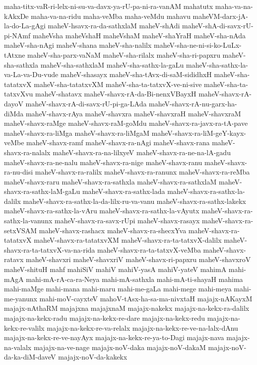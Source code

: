 {maha-titx-vaR-ri-lelx-ni-su-va-davx-ya-rU-pa-ni-ra-vanAM
mahatutx
maha-va-na-kAkxDe
maha-va-na-ridu
maha-veMba
maha-veMdu
mahavu
maheVM-darx-jA-la-do-La-gAgi
maheV-hsavx-ra-da-sathxlaM
maheV-shAdi
maheV-shA-di-savx-rU-pi-NAmf
maheVsha
maheVshaH
maheVshaM
maheV-shaYraH
maheV-sha-nAda
maheV-sha-nAgi
maheV-shana
maheV-sha-nalilx
maheV-sha-ne-ni-si-ko-LuLx-tAtxne
maheV-sha-parx-vaNaM
maheV-sha-rilalx
maheV-sha-ri-papxru
maheV-sha-sathxla
maheV-sha-sathxlaM
maheV-sha-sathx-la-gaLu
maheV-sha-sathx-la-va-La-va-Du-vude
maheV-shasayx
maheV-sha-tAvx-di-saM-sididhxH
maheV-sha-tatatxvX
maheV-sha-tatatxvXM
maheV-sha-ta-tatxvX-ve-ni-sive
maheV-sha-ta-tatxvXvu
maheV-shatavx
maheV-shavx-rA-da-Bi-nenxVBayxH
maheV-shavx-rA-dayoV
maheV-shavx-rA-di-savx-rU-pi-ga-LAda
maheV-shavx-rA-nu-garx-ha-diMda
maheV-shavx-rAya
maheV-shavxra
maheV-shavxraH
maheV-shavxraM
maheV-shavx-raMge
maheV-shavx-raM-goMdu
maheV-shavx-ra-javx-ra-tA-pave
maheV-shavx-ra-liMga
maheV-shavx-ra-liMgaM
maheV-shavx-ra-liM-geY-kayx-veMbe
maheV-shavx-ramf
maheV-shavx-ra-nAgi
maheV-shavx-rana
maheV-shavx-ra-nalalx
maheV-shavx-ra-na-lilxyeV
maheV-shavx-ra-ne-na-lA-gadu
maheV-shavx-ra-ne-nalu
maheV-shavx-ra-nige
maheV-shavx-ranu
maheV-shavx-ra-nu-disi
maheV-shavx-ra-ralilx
maheV-shavx-ra-ranunx
maheV-shavx-ra-reMba
maheV-shavx-raru
maheV-shavx-ra-sathxla
maheV-shavx-ra-sathxlaM
maheV-shavx-ra-sathx-laM-gaLu
maheV-shavx-ra-sathx-lada
maheV-shavx-ra-sathx-la-dalilx
maheV-shavx-ra-sathx-la-da-lilx-ru-va-vanu
maheV-shavx-ra-sathx-lakekx
maheV-shavx-ra-sathx-la-vAru
maheV-shavx-ra-sathx-la-vAyutx
maheV-shavx-ra-sathx-la-vanunx
maheV-shavx-ra-savx-rUpi
maheV-shavx-rasayx
maheV-shavx-ra-setxVSAM
maheV-shavx-rashacx
maheV-shavx-ra-shecxYva
maheV-shavx-ra-tatatxvX
maheV-shavx-ra-tatatxvXM
maheV-shavx-ra-ta-tatxvX-dalilx
maheV-shavx-ra-ta-tatxvX-va-na-rida
maheV-shavx-ra-ta-tatxvX-veMba
maheV-shavx-ratavx
maheV-shavxri
maheV-shavxriV
maheV-shavx-ri-papxru
maheV-shavxroV
maheV-shituH
mahf
mahiSiV
mahiV
mahiV-yasA
mahiV-yateV
mahimA
mahi-mAgA
mahi-mA-rA-ca-ra-Neya
mahi-mA-sathxla
mahi-mA-ti-shayaH
mahima
mahi-maMge
mahi-mana
mahi-maru
mahi-me-gaLa
mahi-mege
mahi-meya
mahi-me-yanunx
mahi-moV-cayxteV
mahoV-tAsx-ha-sa-ma-nivxtaH
majajx-nAKayxM
majajx-nAthaRM
majajxna
majajxnaM
majajx-nakekx
majajx-na-kekx-ra-dalilx
majajx-na-kekx-radu
majajx-na-kekx-re-dare
majajx-na-kekx-redu
majajx-na-kekx-re-valilx
majajx-na-kekx-re-va-relalx
majajx-na-kekx-re-ve-na-lalx-dAnu
majajx-na-kekx-re-ve-nayAyx
majajx-na-kekx-re-ya-to-Dagi
majajx-nava
majajx-na-valalx
majajx-na-ve-nage
majajx-noV-daka
majajx-noV-dakaM
majajx-noV-da-ka-diM-daveV
majajx-noV-da-kakekx
}
